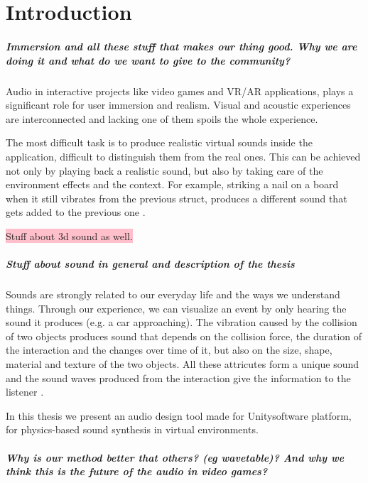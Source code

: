 \chapter{Introduction}

\paragraph{Immersion and all these stuff that makes our thing good. Why we are doing it and what do we want to give to the community?\\}

Audio in interactive projects like video games and VR/AR applications, plays a significant role for user immersion and realism. Visual and acoustic experiences are interconnected and lacking one of them spoils the whole experience. 

The most difficult task is to produce realistic virtual sounds inside the application, difficult to distinguish them from the real ones. This can be achieved not only by playing back a realistic sound, but also by taking care of the environment effects and the context. For example, striking a nail on a board when it still vibrates from the previous struct, produces a different sound that gets added to the previous one \cite{Cook:2002:RSS:515316}.

\colorbox{pink}{Stuff about 3d sound as well.}

\paragraph{Stuff about sound in general and description of the thesis\\}

Sounds are strongly related to our everyday life and the ways we understand things. Through our experience, we can visualize an event by only hearing the sound it produces (e.g. a car approaching). The vibration caused by the collision of two objects produces sound that depends on the collision force, the duration of the interaction  and the changes over time of it, but also on the size, shape, material and texture of the two objects. All these attricutes form a unique sound and the sound waves produced from the interaction give the information to the listener \cite{gaver1993world}.

In this thesis we present an audio design tool made for Unity\textregistered software platform, for physics-based sound synthesis in virtual environments. \\

\paragraph{Why is our method better that others? (eg wavetable)? And why we think this is the future of the audio in video games?\\}
  



